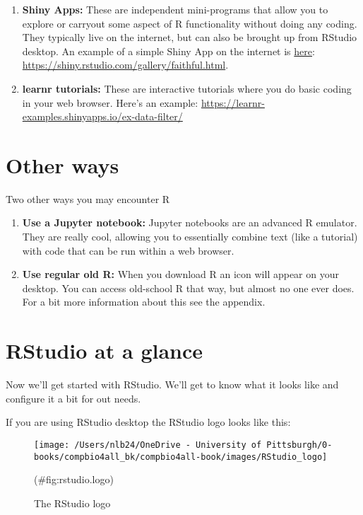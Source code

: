 \documentclass[
]{book}
\providecommand{\tightlist}{%
  \setlength{\itemsep}{0pt}\setlength{\parskip}{0pt}}
\begin{document}
\begin{enumerate}
\def\labelenumi{\arabic{enumi}.}
\tightlist
\item
  \textbf{Shiny Apps:} These are independent mini-programs that allow you to explore or carryout some aspect of R functionality without doing any coding. They typically live on the internet, but can also be brought up from RStudio desktop. An example of a simple Shiny App on the internet is \href{https://shiny.rstudio.com/gallery/faithful.html}{here}: \url{https://shiny.rstudio.com/gallery/faithful.html}.
\item
  \textbf{learnr tutorials:} These are interactive tutorials where you do basic coding in your web browser. Here's an example: \url{https://learnr-examples.shinyapps.io/ex-data-filter/}
\end{enumerate}

\hypertarget{other-ways}{%
\section{Other ways}\label{other-ways}}

Two other ways you may encounter R

\begin{enumerate}
\def\labelenumi{\arabic{enumi}.}
\tightlist
\item
  \textbf{Use a Jupyter notebook:} Jupyter notebooks are an advanced R emulator. They are really cool, allowing you to essentially combine text (like a tutorial) with code that can be run within a web browser.\\
\item
  \textbf{Use regular old R:} When you download R an icon will appear on your desktop. You can access old-school R that way, but almost no one ever does. For a bit more information about this see the appendix.
\end{enumerate}

\hypertarget{rstudio-at-a-glance}{%
\section{RStudio at a glance}\label{rstudio-at-a-glance}}

Now we'll get started with RStudio. We'll get to know what it looks like and configure it a bit for out needs.

If you are using RStudio desktop the RStudio logo looks like this:

\begin{figure}
\texttt{[image: /Users/nlb24/OneDrive - University of Pittsburgh/0-books/compbio4all\_bk/compbio4all-book/images/RStudio\_logo]} \caption{The RStudio logo}(\#fig:rstudio.logo)
\end{figure}
\end{document}
